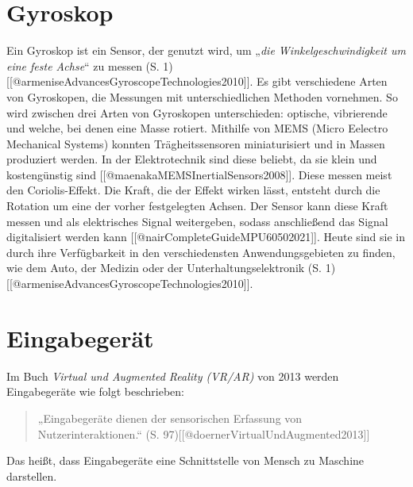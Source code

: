 \section{Gyroskop}
Ein Gyroskop ist ein Sensor, der genutzt wird, um „\textit{die Winkelgeschwindigkeit um eine feste Achse}“ zu messen (S. 1)[[@armeniseAdvancesGyroscopeTechnologies2010]]. Es gibt verschiedene Arten von Gyroskopen, die Messungen mit unterschiedlichen Methoden vornehmen. So wird zwischen drei Arten von Gyroskopen unterschieden: optische, vibrierende und welche, bei denen eine Masse rotiert. Mithilfe von MEMS (Micro Eelectro Mechanical Systems) konnten Trägheitssensoren miniaturisiert und in Massen produziert werden. In der Elektrotechnik sind diese beliebt, da sie klein und kostengünstig sind [[@maenakaMEMSInertialSensors2008]]. Diese messen meist den Coriolis-Effekt. Die Kraft, die der Effekt wirken lässt, entsteht durch die Rotation um eine der vorher festgelegten Achsen. Der Sensor kann diese Kraft messen und als elektrisches Signal weitergeben, sodass anschließend das Signal digitalisiert werden kann [[@nairCompleteGuideMPU60502021]]. Heute sind sie in durch ihre Verfügbarkeit in den verschiedensten Anwendungsgebieten zu finden, wie dem Auto, der Medizin oder der Unterhaltungselektronik (S. 1)[[@armeniseAdvancesGyroscopeTechnologies2010]].

\section{Eingabegerät}
Im Buch \textit{Virtual und Augmented Reality (VR/AR)} von 2013 werden Eingabegeräte wie folgt beschrieben:

\begin{quote}
    „Eingabegeräte dienen der sensorischen Erfassung von Nutzerinteraktionen.“
    (S. 97)[[@doernerVirtualUndAugmented2013]]
\end{quote}

Das heißt, dass Eingabegeräte eine Schnittstelle von Mensch zu Maschine darstellen.